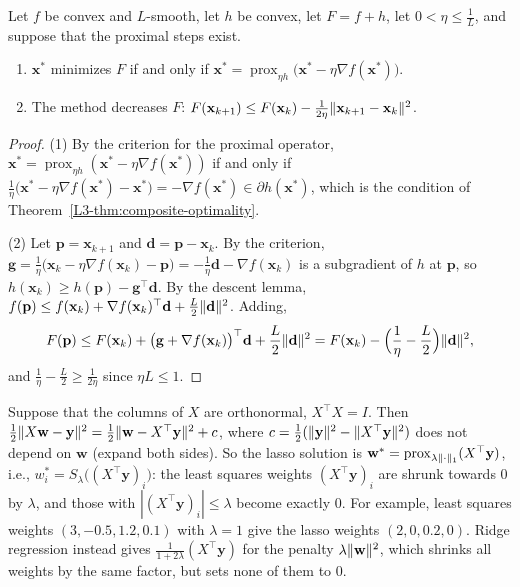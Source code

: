 \begin{theorem}\label{L3-thm:prox-gradient}
    Let $f$ be convex and $L$-smooth, let $h$ be convex, let $F = f + h$, let $0 < \eta \leq \frac{1}{L}$, and suppose that the proximal steps exist.
    \begin{enumerate}
        \item $\mathbf{x}^*$ minimizes $F$ if and only if $\mathbf{x}^* = \operatorname{prox}_{\eta h}\big(\mathbf{x}^* - \eta\nabla f(\mathbf{x}^*)\big)$.
        \item The method decreases $F$: $F(\mathbf{x}_{k+1}) \leq F(\mathbf{x}_k) - \frac{1}{2\eta}\lVert \mathbf{x}_{k+1} - \mathbf{x}_k \rVert^2$.
    \end{enumerate}
\end{theorem}

\begin{proof}
    (1) By the criterion for the proximal operator, $\mathbf{x}^* = \operatorname{prox}_{\eta h}(\mathbf{x}^* - \eta\nabla f(\mathbf{x}^*))$ if and only if $\frac{1}{\eta}\big(\mathbf{x}^* - \eta\nabla f(\mathbf{x}^*) - \mathbf{x}^*\big) = -\nabla f(\mathbf{x}^*) \in \partial h(\mathbf{x}^*)$, which is the condition of Theorem~\ref{L3-thm:composite-optimality}.

    (2) Let $\mathbf{p} = \mathbf{x}_{k+1}$ and $\mathbf{d} = \mathbf{p} - \mathbf{x}_k$. By the criterion, $\mathbf{g} = \frac{1}{\eta}\big(\mathbf{x}_k - \eta\nabla f(\mathbf{x}_k) - \mathbf{p}\big) = -\frac{1}{\eta}\mathbf{d} - \nabla f(\mathbf{x}_k)$ is a subgradient of $h$ at $\mathbf{p}$, so $h(\mathbf{x}_k) \geq h(\mathbf{p}) - \mathbf{g}^\top\mathbf{d}$. By the descent lemma, $f(\mathbf{p}) \leq f(\mathbf{x}_k) + \nabla f(\mathbf{x}_k)^\top\mathbf{d} + \frac{L}{2}\lVert \mathbf{d} \rVert^2$. Adding,
    \[F(\mathbf{p}) \leq F(\mathbf{x}_k) + \big(\mathbf{g} + \nabla f(\mathbf{x}_k)\big)^\top\mathbf{d} + \frac{L}{2}\lVert \mathbf{d} \rVert^2 = F(\mathbf{x}_k) - \Big(\frac{1}{\eta} - \frac{L}{2}\Big)\lVert \mathbf{d} \rVert^2,\]
    and $\frac{1}{\eta} - \frac{L}{2} \geq \frac{1}{2\eta}$ since $\eta L \leq 1$.
\end{proof}

\begin{example}\label{L3-ex:lasso}
    Suppose that the columns of $X$ are orthonormal, $X^\top X = I$. Then $\frac{1}{2}\lVert X\mathbf{w} - \mathbf{y} \rVert^2 = \frac{1}{2}\lVert \mathbf{w} - X^\top\mathbf{y} \rVert^2 + c$, where $c = \frac{1}{2}(\lVert \mathbf{y} \rVert^2 - \lVert X^\top\mathbf{y} \rVert^2)$ does not depend on $\mathbf{w}$ (expand both sides). So the lasso solution is $\mathbf{w}^* = \operatorname{prox}_{\lambda\lVert \cdot \rVert_1}(X^\top\mathbf{y})$, i.e., $w_i^* = S_\lambda\big((X^\top\mathbf{y})_i\big)$: the least squares weights $(X^\top\mathbf{y})_i$ are shrunk towards $0$ by $\lambda$, and those with $|(X^\top\mathbf{y})_i| \leq \lambda$ become exactly $0$. For example, least squares weights $(3, -0.5, 1.2, 0.1)$ with $\lambda = 1$ give the lasso weights $(2, 0, 0.2, 0)$. Ridge regression instead gives $\frac{1}{1 + 2\lambda}(X^\top\mathbf{y})$ for the penalty $\lambda\lVert \mathbf{w} \rVert^2$, which shrinks all weights by the same factor, but sets none of them to $0$.
\end{example}

